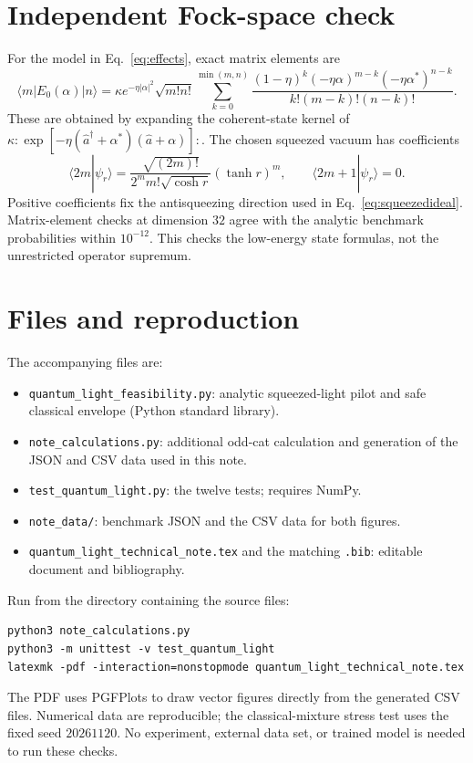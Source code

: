 \documentclass[11pt,a4paper]{article}
\newcommand{\ket}[1]{\lvert #1\rangle}
\newcommand{\bra}[1]{\langle #1\rvert}
\newcommand{\abs}[1]{\lvert #1\rvert}
\begin{document}
\appendix
\section{Independent Fock-space check}
For the model in Eq.~\eqref{eq:effects}, exact matrix elements are
\begin{equation}
 \bra m E_0(\alpha)\ket n
 =\kappa e^{-\eta\abs\alpha^2}\sqrt{m!n!}
 \sum_{k=0}^{\min(m,n)}
 \frac{(1-\eta)^k(-\eta\alpha)^{m-k}(-\eta\alpha^*)^{n-k}}
 {k!(m-k)!(n-k)!}.
 \label{eq:fockeffect}
\end{equation}
These are obtained by expanding the coherent-state kernel of
$\kappa:\!\exp[-\eta(\hat a^\dagger+\alpha^*)(\hat a+\alpha)]\!:$.
The chosen squeezed vacuum has coefficients
\begin{equation}
 \langle2m|\psi_r\rangle=
 \frac{\sqrt{(2m)!}}{2^m m!\sqrt{\cosh r}}(\tanh r)^m,
 \qquad \langle2m+1|\psi_r\rangle=0.
\end{equation}
Positive coefficients fix the antisqueezing direction used in
Eq.~\eqref{eq:squeezedideal}. Matrix-element checks at dimension $32$ agree
with the analytic benchmark probabilities within $10^{-12}$. This checks
the low-energy state formulas, not the unrestricted operator supremum.

\section{Files and reproduction}
The accompanying files are:
\begin{itemize}
\item \texttt{quantum\_light\_feasibility.py}: analytic squeezed-light pilot
and safe classical envelope (Python standard library).
\item \texttt{note\_calculations.py}: additional odd-cat calculation and
generation of the JSON and CSV data used in this note.
\item \texttt{test\_quantum\_light.py}: the twelve tests; requires NumPy.
\item \texttt{note\_data/}: benchmark JSON and the CSV data for both figures.
\item \texttt{quantum\_light\_technical\_note.tex} and the matching
\texttt{.bib}: editable document and bibliography.
\end{itemize}
Run from the directory containing the source files:
\begin{verbatim}
python3 note_calculations.py
python3 -m unittest -v test_quantum_light
latexmk -pdf -interaction=nonstopmode quantum_light_technical_note.tex
\end{verbatim}
The PDF uses PGFPlots to draw vector figures directly from the generated CSV
files. Numerical data are reproducible; the classical-mixture stress test uses
the fixed seed $20261120$. No experiment, external data set, or trained model
is needed to run these checks.

\begingroup
\small
\setlength{\bibsep}{3pt}


\endgroup
\end{document}

